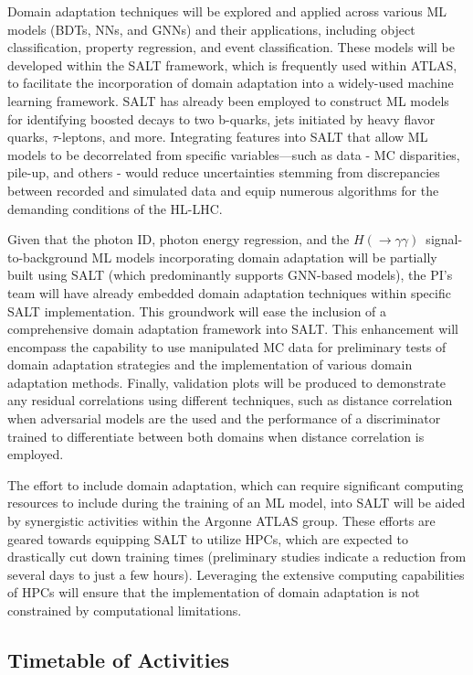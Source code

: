\documentclass[letter, USenglish, 11pt, subfigure]{article}
\newcommand{\hyy}{\ensuremath{H(\to\gamma\gamma)}}
\begin{document}
Domain adaptation techniques will be explored and applied across various ML models (BDTs, NNs, and GNNs) and their applications, including object classification, property regression, and event classification. These models will be developed within the SALT framework, which is frequently used within ATLAS, to facilitate the incorporation of domain adaptation into a widely-used machine learning framework. SALT has already been employed to construct ML models for identifying boosted decays to two b-quarks, jets initiated by heavy flavor quarks, $\tau$-leptons, and more. Integrating features into SALT that allow ML models to be decorrelated from specific variables—such as data - MC disparities, pile-up, and others - would reduce uncertainties stemming from discrepancies between recorded and simulated data and equip numerous algorithms for the demanding conditions of the HL-LHC.

Given that the photon ID, photon energy regression, and the \hyy\ signal-to-background ML models incorporating domain adaptation will be partially built using SALT (which predominantly supports GNN-based models), the PI's team will have already embedded domain adaptation techniques within specific SALT implementation. This groundwork will ease the inclusion of a comprehensive domain adaptation framework into SALT. This enhancement will encompass the capability to use manipulated MC data for preliminary tests of domain adaptation strategies and the implementation of various domain adaptation methods. Finally, validation plots will be produced to demonstrate any residual correlations using different techniques, such as distance correlation when adversarial models are the used and the performance of a discriminator trained to differentiate between both domains when distance correlation is employed.

The effort to include domain adaptation, which can require significant computing resources to include during the training of an ML model, into SALT will be aided by synergistic activities within the Argonne ATLAS group. These efforts are geared towards equipping SALT to utilize HPCs, which are expected to drastically cut down training times (preliminary studies indicate a reduction from several days to just a few hours). Leveraging the extensive computing capabilities of HPCs will ensure that the implementation of domain adaptation is not constrained by computational limitations.

\subsection{Timetable of Activities}
\label{sec:timetable}
\end{document}
